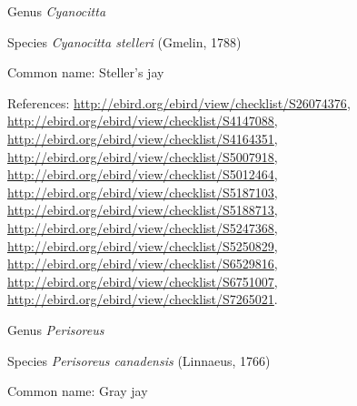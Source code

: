\documentclass[9pt, article]{memoir}
\begin{document}
\begin{multicols}{2}
\vspace{6pt}\noindent\hspace{30pt}Genus \textit{Cyanocitta}


\vspace{6pt}\noindent\hspace{36pt}Species \textit{Cyanocitta stelleri} (Gmelin, 1788)


Common name: Steller's jay

References: 
\url{http://ebird.org/ebird/view/checklist/S26074376}, 
\url{http://ebird.org/ebird/view/checklist/S4147088}, 
\url{http://ebird.org/ebird/view/checklist/S4164351}, 
\url{http://ebird.org/ebird/view/checklist/S5007918}, 
\url{http://ebird.org/ebird/view/checklist/S5012464}, 
\url{http://ebird.org/ebird/view/checklist/S5187103}, 
\url{http://ebird.org/ebird/view/checklist/S5188713}, 
\url{http://ebird.org/ebird/view/checklist/S5247368}, 
\url{http://ebird.org/ebird/view/checklist/S5250829}, 
\url{http://ebird.org/ebird/view/checklist/S6529816}, 
\url{http://ebird.org/ebird/view/checklist/S6751007}, 
\url{http://ebird.org/ebird/view/checklist/S7265021}.

\vspace{6pt}\noindent\hspace{30pt}Genus \textit{Perisoreus}


\vspace{6pt}\noindent\hspace{36pt}Species \textit{Perisoreus canadensis} (Linnaeus, 1766)


Common name: Gray jay


\end{multicols}
\end{document}

